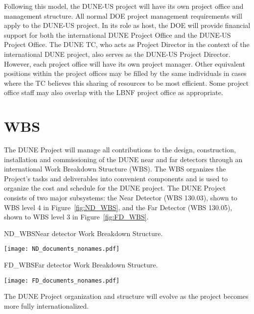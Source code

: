 Following this model, the DUNE-US project will have its own project
office and management structure.  All normal DOE project management
requirements will apply to the DUNE-US project.  In its role as host,
the DOE will provide financial support for both the international DUNE
Project Office and the DUNE-US Project Office. The DUNE TC, who acts
as Project Director in the context of the international DUNE project,
also serves as the DUNE-US Project Director.  However, each project
office will have its own project manager.  Other equivalent positions
within the project offices may be filled by the same individuals in
cases where the TC believes this sharing of resources to be most
efficient. Some project office staff may also overlap with the LBNF
project office as appropriate.


\section[Work Breakdown Structure (WBS)]{WBS}

The DUNE Project will manage all contributions to the design,
construction, installation and commissioning of the DUNE near and far
detectors through an international Work Breakdown Structure (WBS).
The WBS organizes the Project's tasks and deliverables into convenient
components and is used to organize the cost and schedule for the DUNE
project. The DUNE Project consists of two major subsystems: the Near Detector
(WBS 130.03), shown to WBS level 4 in Figure~\ref{fig:ND_WBS}, and the
Far Detector (WBS 130.05), shown to WBS level 3 in
Figure~\ref{fig:FD_WBS}.
\begin{cdrfigure}{ND_WBS}{Near detector Work Breakdown Structure.}
\centering
\begin{center}
\texttt{[image: ND\_documents\_nonames.pdf]}
\end{center}
\end{cdrfigure}
\begin{cdrfigure}{FD_WBS}{Far detector Work Breakdown Structure.}
\centering
\begin{center}
\texttt{[image: FD\_documents\_nonames.pdf]}
\end{center}
\end{cdrfigure}
The DUNE Project organization and structure will evolve as the project
becomes more fully internationalized.
